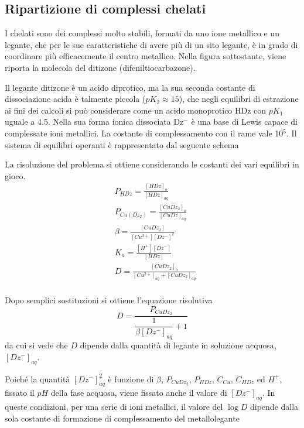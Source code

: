 \subsection{Ripartizione di complessi chelati}
I chelati sono dei complessi molto stabili, formati da uno ione metallico e un legante, che per le sue caratteristiche di avere più di un sito legante, è in grado di coordinare più efficacemente il centro metallico. Nella figura sottostante, viene riporta la molecola del ditizone (difeniltiocarbazone).


Il legante ditizone è un acido diprotico, ma la sua seconda costante di dissociazione acida è talmente piccola ($pK_2 \approx 15$), che negli equilibri di estrazione ai fini dei calcoli si può considerare come un acido monoprotico HDz con $pK_1$ uguale a 4.5. Nella sua forma ionica dissociata Dz$^-$ è una base di Lewis capace di complessate ioni metallici. La costante di complessamento con il rame vale 10$^5$. Il sistema di equilibri operanti è rappresentato dal seguente schema

La risoluzione del problema si ottiene considerando le costanti dei vari equilibri in gioco.
\begin{align} \label{eq:ripartizione:7}
& P_{HDz} = \frac{[HDz]_o}{[HDz]_{aq}}\\
& P_{Cu(Dz_2)} = \frac{[CuDz_2]_o}{[CuDz]_{aq}}\\
& \beta = \frac{[CuDz_2]}{[Cu^{2+}][Dz^-]^2}\\
& K_a = \frac{[H^+][Dz^-]}{[HDz]}\\
& D = \frac{[CuDz_2]_o}{[Cu^{2+}]_{aq} + [CuDz_2]_{aq}}\\
\end{align}

Dopo semplici sostituzioni si ottiene l'equazione risolutiva
\begin{equation} \label{eq:ripartizione:6}
D = \dfrac{P_{CuDz_2}}{\dfrac{1}{\beta [Dz^-]_{aq}} + 1}
\end{equation}
da cui si vede che $D$ dipende dalla quantità di legante in soluzione acquosa, $[Dz^-]_{aq}$. 


Poiché la quantità $[Dz^-]^2_{aq}$ è funzione di $\beta$, $P_{CuDz_2}$, $P_{HDz}$, $C_{Cu}$, $C_{HDz}$ ed $H^+$, fissato il $pH$ della fase acquosa, viene fissato anche il valore di $[Dz^-]_{aq}$. In queste condizioni, per una serie di ioni metallici, il valore del $\log D$ dipende dalla sola costante di formazione di complessamento del metallolegante

